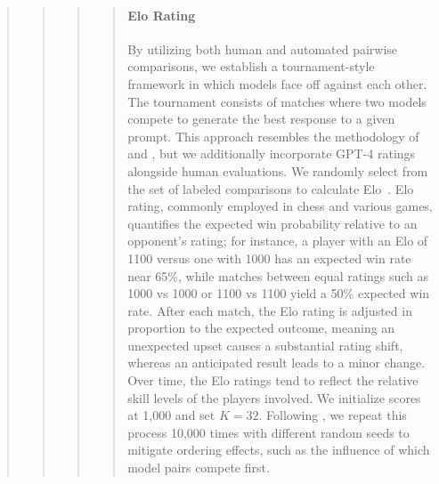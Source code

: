 \begin{quote}
\begin{quote}
\begin{quote}
\begin{quote}
\paragraph{Elo Rating} By utilizing both human and automated pairwise comparisons, we establish a tournament-style framework in which models face off against each other. The tournament consists of matches where two models compete to generate the best response to a given prompt. This approach resembles the methodology of \citet{bai2022training} and \citet{vicuna2023}, but we additionally incorporate GPT-4 ratings alongside human evaluations. We randomly select from the set of labeled comparisons to calculate Elo~\citep{elo1967proposed,elo1978rating}. Elo rating, commonly employed in chess and various games, quantifies the expected win probability relative to an opponent's rating; for instance, a player with an Elo of 1100 versus one with 1000 has an expected win rate near 65\%, while matches between equal ratings such as 1000 vs 1000 or 1100 vs 1100 yield a 50\% expected win rate. After each match, the Elo rating is adjusted in proportion to the expected outcome, meaning an unexpected upset causes a substantial rating shift, whereas an anticipated result leads to a minor change. Over time, the Elo ratings tend to reflect the relative skill levels of the players involved. We initialize scores at 1,000 and set $K=32$. Following \citet{vicuna2023}, we repeat this process 10,000 times with different random seeds to mitigate ordering effects, such as the influence of which model pairs compete first.


\end{quote}
\end{quote}
\end{quote}
\end{quote}
